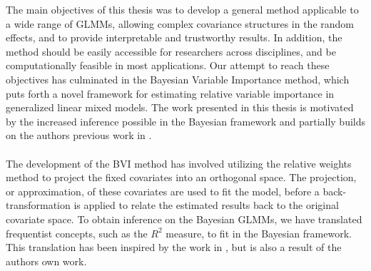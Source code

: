 

The main objectives of this thesis was to develop a general method applicable to a wide range of GLMMs, allowing complex covariance structures in the random effects, and to provide interpretable and trustworthy results. In addition, the method should be easily accessible for researchers across disciplines, and be computationally feasible in most applications. Our attempt to reach these objectives has culminated in the Bayesian Variable Importance method, which puts forth a novel framework for estimating relative variable importance in generalized linear mixed models. The work presented in this thesis is motivated by the increased inference possible in the Bayesian framework and partially builds on the authors previous work in \citet{Arnstad:Relative_variable_importance_in_Bayesian_linear_mixed_models:2024}.
\\
\\
The development of the BVI method has involved utilizing the relative weights method \citep{johnson_relative_weights} to project the fixed covariates into an orthogonal space. The projection, or approximation, of these covariates are used to fit the model, before a back-transformation is applied to relate the estimated results back to the original covariate space. To obtain inference on the Bayesian GLMMs, we have translated frequentist concepts, such as the $R^2$ measure, to fit in the Bayesian framework. This translation has been inspired by the work in \citet{gelman2017rsquared}, but is also a result of the authors own work. 
